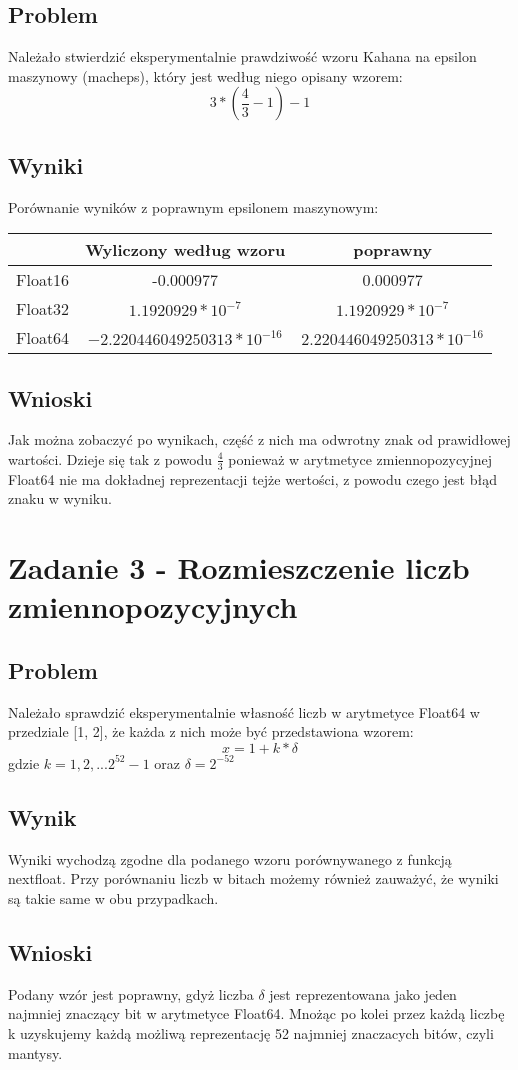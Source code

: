 \documentclass[12pt, a4paper]{article}
\begin{document}
\subsection{Problem}
Należało stwierdzić eksperymentalnie prawdziwość wzoru Kahana na epsilon maszynowy (macheps), który jest według niego opisany wzorem:
\[3*(\frac{4}{3} - 1) - 1\]
\subsection{Wyniki}
Porównanie wyników z poprawnym epsilonem maszynowym:
\begin{center}
\begin{tabular}{ c|c|c}
  & Wyliczony według wzoru & poprawny\\
  \hline
 Float16 & -0.000977 & 0.000977\\
 Float32 & $1.1920929 * 10^{-7}$ & $1.1920929 * 10^{-7}$\\
 Float64 & $-2.220446049250313 * 10^{-16}$ & $2.220446049250313 * 10^{-16}$
\end{tabular}
\end{center}
\subsection{Wnioski}
Jak można zobaczyć po wynikach, część z nich ma odwrotny znak od prawidłowej wartości. Dzieje się tak z powodu $\frac{4}{3}$ ponieważ w arytmetyce zmiennopozycyjnej Float64 nie ma dokładnej reprezentacji tejże wertości, z powodu czego jest błąd znaku w wyniku.

\section{Zadanie 3 - Rozmieszczenie liczb zmiennopozycyjnych}
\subsection{Problem}
Należało sprawdzić eksperymentalnie własność liczb w arytmetyce Float64 w przedziale [1, 2], że każda z nich może być przedstawiona wzorem:
\[x =1 + k * \delta \] gdzie $k = 1, 2, ... 2^{52}-1$ oraz $\delta = 2^{-52}$
\subsection{Wynik}
Wyniki wychodzą zgodne dla podanego wzoru porównywanego z funkcją nextfloat. Przy porównaniu liczb w bitach możemy również zauważyć, że wyniki są takie same w obu przypadkach.
\subsection{Wnioski}
Podany wzór jest poprawny, gdyż liczba $\delta$ jest reprezentowana jako jeden najmniej znaczący bit w arytmetyce Float64. Mnożąc po kolei przez każdą liczbę k uzyskujemy każdą możliwą reprezentację 52 najmniej znaczacych bitów, czyli mantysy.
\end{document}
